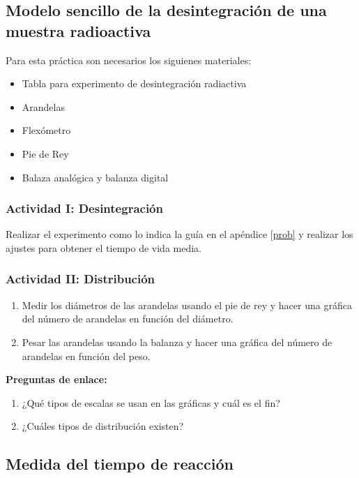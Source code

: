 \documentclass[12pt]{article}
\begin{document}

\subsection{Modelo sencillo de la desintegración de una muestra radioactiva}

Para esta práctica son necesarios los siguienes materiales:
\begin{itemize}
    \item Tabla para experimento de desintegración radiactiva
    \item Arandelas
    \item Flexómetro
    \item Pie de Rey
    \item Balaza analógica y balanza digital
\end{itemize}

\subsubsection{Actividad I: Desintegración}
Realizar el experimento como lo indica la guía en el apéndice \ref{prob} y realizar los ajustes para obtener el tiempo de vida media.

\subsubsection{Actividad II: Distribución}
\begin{enumerate}
    \item Medir los diámetros de las arandelas usando el pie de rey y hacer una gráfica del número de arandelas en función del diámetro.
    \item Pesar las arandelas usando la balanza y hacer una gráfica del número de arandelas en función del peso.
\end{enumerate}

\textbf{Preguntas de enlace:}
\begin{enumerate}
    \item ¿Qué tipos de escalas se usan en las gráficas y cuál es el fin?
    \item ¿Cuáles tipos de distribución existen?
\end{enumerate}


\subsection{Medida del tiempo de reacción}
\end{document}
